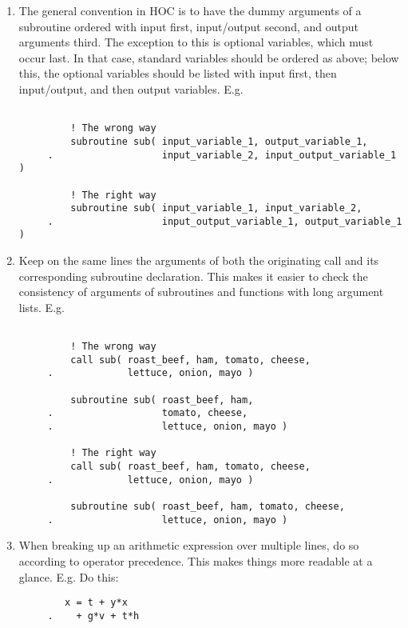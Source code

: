 \documentclass[letterpaper,12pt]{article}
\begin{document}
\begin{enumerate}
\item The general convention in HOC is to have the dummy arguments of a subroutine 
ordered with input first, input/output second, and output arguments third. 
The exception to this is optional variables, which must occur last.  In that case,
standard variables should be ordered as above; below this, the optional variables should
be listed with input first, then input/output, and then output variables.
\newline
E.g.
\begin{verbatim}

         ! The wrong way
         subroutine sub( input_variable_1, output_variable_1, 
     .                   input_variable_2, input_output_variable_1 )

         ! The right way
         subroutine sub( input_variable_1, input_variable_2, 
     .                   input_output_variable_1, output_variable_1 )

\end{verbatim}

\item Keep on the same lines the arguments of both the originating call and its 
corresponding subroutine declaration.  This makes it easier to check the 
consistency of arguments of subroutines and functions with long argument lists.
\newline 
E.g.
\begin{verbatim}

         ! The wrong way
         call sub( roast_beef, ham, tomato, cheese,
     .             lettuce, onion, mayo )

         subroutine sub( roast_beef, ham, 
     .                   tomato, cheese,
     .                   lettuce, onion, mayo )

         ! The right way
         call sub( roast_beef, ham, tomato, cheese,
     .             lettuce, onion, mayo )

         subroutine sub( roast_beef, ham, tomato, cheese,
     .                   lettuce, onion, mayo )

\end{verbatim}

\item When breaking up an arithmetic expression over multiple lines, do so according to 
operator precedence.  This makes things more readable at a glance. \newline
E.g. Do this: 
\begin{verbatim}
        x = t + y*x 
     .    + g*v + t*h
\end{verbatim}


\end{enumerate}
\end{document}
